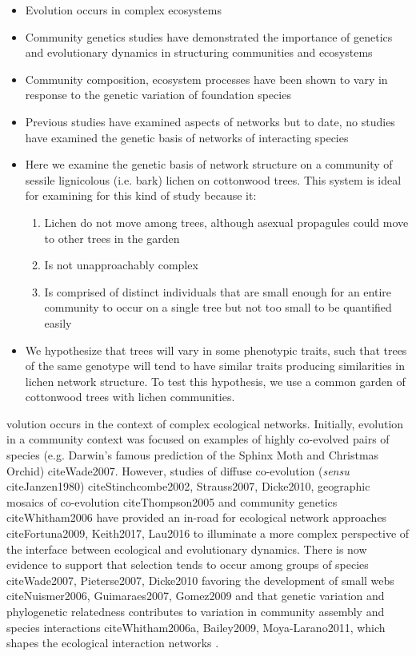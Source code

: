 \documentclass[11pt,twocolumn,twoside,lineno]{pnas-new}
\begin{document}
\begin{itemize}
\item Evolution occurs in complex ecosystems
\item Community genetics studies have demonstrated the importance of
genetics and evolutionary dynamics in structuring communities and
ecosystems
\item Community composition, ecosystem processes have been shown to vary
in response to the genetic variation of foundation species
\item Previous studies have examined aspects of networks but to date, no
studies have examined the genetic basis of networks of interacting
species
\item Here we examine the genetic basis of network structure on a
community of sessile lignicolous (i.e. bark) lichen on cottonwood
trees. This system is ideal for examining for this kind of study
because it:

\begin{enumerate}
\item Lichen do not move among trees, although asexual propagules could
  move to other trees in the garden 
\item Is not unapproachably complex
\item Is comprised of distinct individuals that are small enough for an
  entire community to occur on a single tree but not too small to be
  quantified easily
\end{enumerate}

\item We hypothesize that trees will vary in some phenotypic traits, such
that trees of the same genotype will tend to have similar traits
producing similarities in lichen network structure. To test this
hypothesis, we use a common garden of cottonwood trees with lichen
communities.
\end{itemize}


volution occurs in the context of complex ecological
networks. Initially, evolution in a community context was focused on
examples of highly co-evolved pairs of species (e.g. Darwin's famous
prediction of the Sphinx Moth and Christmas Orchid)
cite{Wade2007}. However, studies of diffuse co-evolution
(\textit{sensu} cite{Janzen1980}) cite{Stinchcombe2002, Strauss2007,
  Dicke2010}, geographic mosaics of co-evolution cite{Thompson2005}
and community genetics cite{Whitham2006} have provided an in-road for
ecological network approaches cite{Fortuna2009, Keith2017, Lau2016} to
illuminate a more complex perspective of the interface between
ecological and evolutionary dynamics. There is now evidence to support
that selection tends to occur among groups of species cite{Wade2007,
  Pieterse2007, Dicke2010} favoring the development of small webs
cite{Nuismer2006, Guimaraes2007, Gomez2009} and that genetic variation
and phylogenetic relatedness contributes to variation in community
assembly \cite{Crutsinger2016} and species interactions
cite{Whitham2006a, Bailey2009, Moya-Larano2011}, which shapes the
ecological interaction networks \cite{Rezende2007}. 
\end{document}
